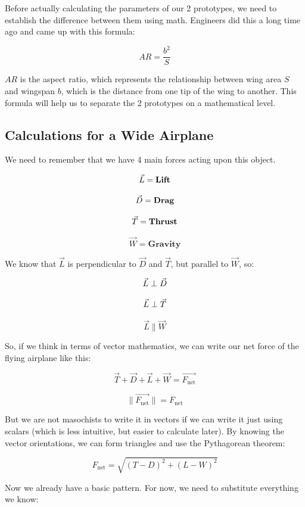 \documentclass[12pt]{article}
\begin{document}
Before actually calculating the parameters of our 2 prototypes, we need to establish the difference between them using math. Engineers did this a long time ago and came up with this formula:

\[
AR = \frac{b^2}{S}
\]

$AR$ is the aspect ratio, which represents the relationship between wing area $S$ and wingspan $b$, which is the distance from one tip of the wing to another. This formula will help us to separate the 2 prototypes on a mathematical level.

\subsection{Calculations for a Wide Airplane}

We need to remember that we have 4 main forces acting upon this object.

\[ 
\vec{L} = \textbf{Lift}\\
\]

\[
\vec{D} = \textbf{Drag}\\
\]

\[
\vec{T} = \textbf{Thrust}\\
\]

\[
\vec{W} = \textbf{Gravity}
\]

We know that $\vec{L}$ is perpendicular to $\vec{D}$ and $\vec{T}$, but parallel to $\vec{W}$, so:

\[ 
\vec{L} \perp \vec{D}\\
\]

\[
\vec{L} \perp \vec{T}\\
\]

\[
\vec{L} \parallel \vec{W}
\]

So, if we think in terms of vector mathematics, we can write our net force of the flying airplane like this:

\[ 
\vec{T} + \vec{D} + \vec{L} + \vec{W} = \vec{F_{\mathrm{net}}} 
\]

\[
\lVert \vec{F_{\mathrm{net}}} \rVert= F_{\mathrm{net}}
\]

But we are not masochists to write it in vectors if we can write it just using scalars (which is less intuitive, but easier to calculate later). By knowing the vector orientations, we can form triangles and use the Pythagorean theorem:

\[
F_{\mathrm{net}} = \sqrt{(T-D)^2+(L-W)^2}
\]

Now we already have a basic pattern. For now, we need to substitute everything we know:
\end{document}
